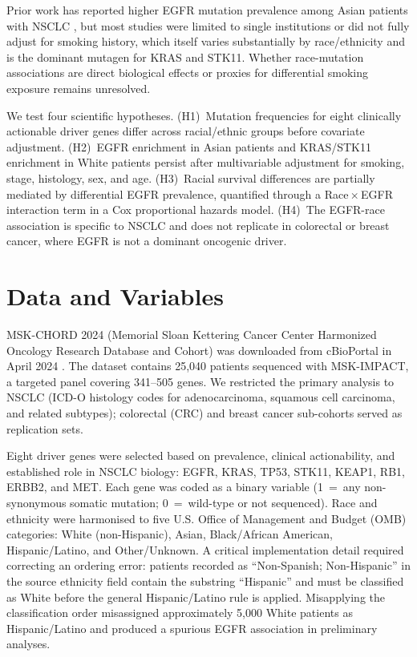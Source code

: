 \documentclass[12pt]{article}
\begin{document}
Prior work has reported higher EGFR mutation prevalence among Asian patients
with NSCLC \cite{Shigematsu2005}, but most studies were limited to single
institutions or did not fully adjust for smoking history, which itself varies
substantially by race/ethnicity and is the dominant mutagen for KRAS and
STK11.
Whether race-mutation associations are direct biological effects or proxies
for differential smoking exposure remains unresolved.

We test four scientific hypotheses.
(H1)~Mutation frequencies for eight clinically actionable driver genes differ
across racial/ethnic groups before covariate adjustment.
(H2)~EGFR enrichment in Asian patients and KRAS/STK11 enrichment in White
patients persist after multivariable adjustment for smoking, stage, histology,
sex, and age.
(H3)~Racial survival differences are partially mediated by differential EGFR
prevalence, quantified through a Race\,$\times$\,EGFR interaction term in a
Cox proportional hazards model.
(H4)~The EGFR-race association is specific to NSCLC and does not replicate in
colorectal or breast cancer, where EGFR is not a dominant oncogenic driver.

\section{Data and Variables}

MSK-CHORD 2024 (Memorial Sloan Kettering Cancer Center Harmonized Oncology
Research Database and Cohort) was downloaded from cBioPortal in April 2024
\cite{Cerami2012}.
The dataset contains 25,040 patients sequenced with MSK-IMPACT, a targeted
panel covering 341--505 genes.
We restricted the primary analysis to NSCLC (ICD-O histology codes for
adenocarcinoma, squamous cell carcinoma, and related subtypes); colorectal
(CRC) and breast cancer sub-cohorts served as replication sets.

Eight driver genes were selected based on prevalence, clinical actionability,
and established role in NSCLC biology: EGFR, KRAS, TP53, STK11, KEAP1, RB1,
ERBB2, and MET.
Each gene was coded as a binary variable (1~=~any non-synonymous somatic
mutation; 0~=~wild-type or not sequenced).
Race and ethnicity were harmonised to five U.S. Office of Management and
Budget (OMB) categories: White (non-Hispanic), Asian, Black/African American,
Hispanic/Latino, and Other/Unknown.
A critical implementation detail required correcting an ordering error: patients
recorded as ``Non-Spanish; Non-Hispanic'' in the source ethnicity field contain
the substring ``Hispanic'' and must be classified as White before the general
Hispanic/Latino rule is applied.
Misapplying the classification order misassigned approximately 5,000 White
patients as Hispanic/Latino and produced a spurious EGFR association in
preliminary analyses.
\end{document}
